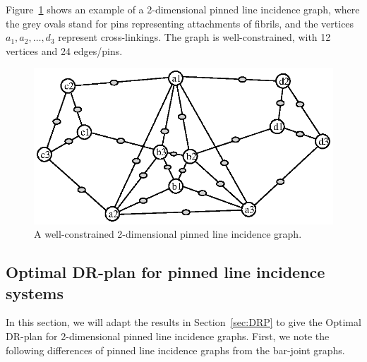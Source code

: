 Figure~\ref{fig:pinned_line} shows an example of a 2-dimensional pinned line incidence graph,
where the grey ovals stand for pins representing attachments of fibrils,
and the vertices $a_1,a_2,\ldots, d_3$ represent cross-linkings.
The graph is well-constrained, with 12 vertices and 24 edges/pins.

\begin{figure}
  \centering
   \includegraphics[width=.9\linewidth]{img/pinned}
\caption{ A well-constrained 2-dimensional pinned line incidence graph.}
\label{fig:pinned_line}
\end{figure}


\subsection{Optimal DR-plan for pinned line incidence systems}


In this section, we will adapt the results in Section~\ref{sec:DRP}
to give the Optimal DR-plan for 2-dimensional pinned line incidence graphs.
First, we note the following differences of pinned line incidence graphs from the bar-joint graphs.

